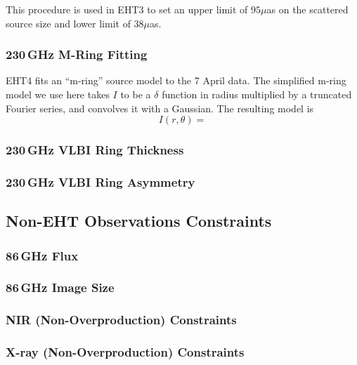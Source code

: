 This procedure is used in EHT3 to set an upper limit of $95\mu$as on the scattered source size and lower limit of $38\mu$as.  

\subsubsection{230\,GHz M-Ring Fitting}

EHT4 fits an ``m-ring'' source model to the 7 April data.  The simplified m-ring model we use here takes $I$ to be a $\delta$ function in radius multiplied by a truncated Fourier series, and convolves it with a Gaussian.  The resulting model is
\begin{equation}
    I(r,\theta) = 
\end{equation}

\subsubsection{230\,GHz VLBI Ring Thickness}

\subsubsection{230\,GHz VLBI Ring Asymmetry}



\subsection{Non-EHT Observations Constraints}

\subsubsection{86\,GHz Flux}
\subsubsection{86\,GHz Image Size}
\subsubsection{NIR (Non-Overproduction) Constraints}
\subsubsection{X-ray (Non-Overproduction) Constraints}


